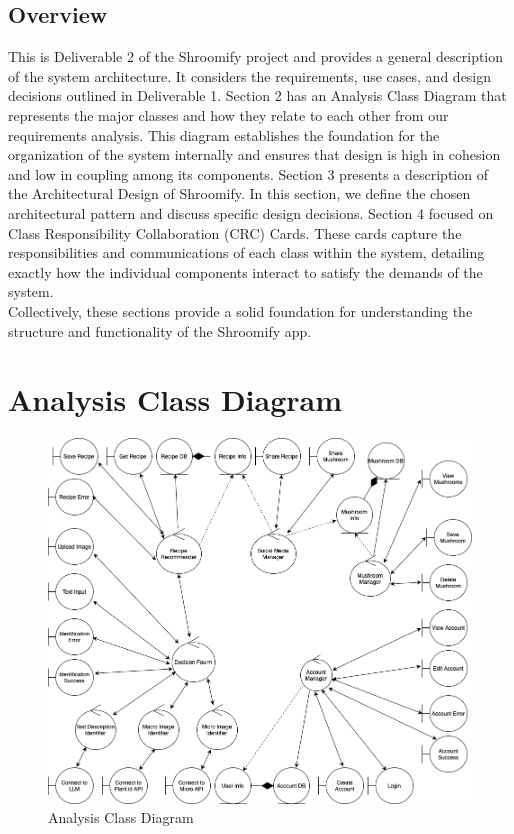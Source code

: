 \documentclass[]{article}
\begin{document}

\subsection{Overview}
\label{sub:overview}
This is Deliverable 2 of the Shroomify project and provides a general description of the system architecture. It considers the requirements, use cases, and design decisions outlined in Deliverable 1. Section 2 has an Analysis Class Diagram that represents the major classes and how they relate to each other from our requirements analysis. This diagram establishes the foundation for the organization of the system internally and ensures that design is high in cohesion and low in coupling among its components. Section 3 presents a description of the Architectural Design of Shroomify. In this section, we define the chosen architectural pattern and discuss specific design decisions. Section 4 focused on Class Responsibility Collaboration (CRC) Cards. These cards capture the responsibilities and communications of each class within the system, detailing exactly how the individual components interact to satisfy the demands of the system.\\
Collectively, these sections provide a solid foundation for understanding the structure and functionality of the Shroomify app.

\clearpage
\section{Analysis Class Diagram}
\label{sec:analysis_class_diagram}
\begin{figure}[h]
    \centering
    \includegraphics[width=1\textwidth]{AnalysisClassDiagram.png}
    \caption{Analysis Class Diagram}
    \label{fig:sample}
\end{figure}
\end{document}

